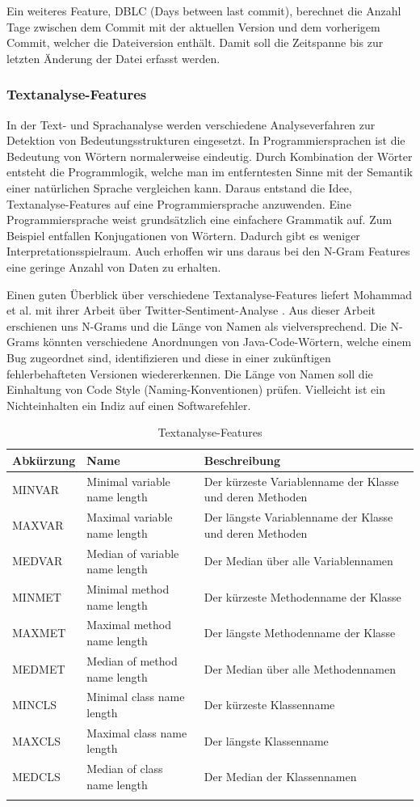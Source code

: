 \documentclass[10pt, a4paper]{article}
\begin{document}
Ein weiteres Feature, DBLC (Days between last commit), berechnet die Anzahl Tage zwischen dem Commit mit der aktuellen Version und dem vorherigem Commit, welcher die Dateiversion enthält. Damit soll die Zeitspanne bis zur letzten Änderung der Datei erfasst werden.

\subsubsection{Textanalyse-Features}
In der Text- und Sprachanalyse werden verschiedene Analyseverfahren zur Detektion von Bedeutungsstrukturen eingesetzt. In Programmiersprachen ist die Bedeutung von Wör\-tern normalerweise eindeutig. Durch Kombination der Wör\-ter entsteht die Programmlogik, welche man im entferntesten Sinne mit der Semantik einer natürlichen Sprache vergleichen kann. Daraus entstand die Idee, Textanalyse-Features auf eine Programmiersprache anzuwenden.
Eine Programmiersprache weist grundsätzlich eine einfachere Grammatik auf. Zum Beispiel entfallen Konjugationen von Wörtern. Dadurch gibt es weniger Interpretationsspielraum. Auch erhoffen wir uns daraus bei den N-Gram Features eine geringe Anzahl von Daten zu erhalten.

Einen guten Überblick über verschiedene Textanalyse-Features liefert Mohammad et al. mit ihrer Arbeit über Twitter-Sentiment-Analyse \cite{DBLP:journals/corr/MohammadKZ13}. Aus dieser Arbeit erschienen uns N-Grams und die Länge von Namen als vielversprechend. Die N-Grams könnten verschiedene Anordnungen von Java-Code-Wörtern, welche einem Bug zugeordnet sind, identifizieren und diese in einer zukünftigen fehlerbehafteten Versionen wiedererkennen. Die Länge von Namen soll die Einhaltung von Code Style (Naming-Konventionen) prüfen. Vielleicht ist ein Nichteinhalten ein Indiz auf einen Softwarefehler.

\begin{longtable}{l|p{3cm}|p{5.75cm}}
		\textbf{Abkürzung} & \textbf{Name} & \textbf{Beschreibung}\\
		\hline
		MINVAR & Minimal variable name length & Der kürzeste Variablenname der Klasse und deren Methoden\\
		MAXVAR & Maximal variable name length & Der längste Variablenname der Klasse und deren Methoden\\
		MEDVAR & Median of variable name length & Der Median über alle Variablennamen\\
		MINMET & Minimal method name length & Der kürzeste Methodenname der Klasse\\
		MAXMET & Maximal method name length & Der längste Methodenname der Klasse\\
		MEDMET & Median of method name length & Der Median über alle Methodennamen\\
		MINCLS & Minimal class name length & Der kürzeste Klassenname\\
		MAXCLS & Maximal class name length & Der längste Klassenname\\
		MEDCLS & Median of class name length & Der Median der Klassennamen\\
	\caption{Textanalyse-Features}
	\label{tab:textanalysisfeatures}
\end{longtable}
\end{document}

